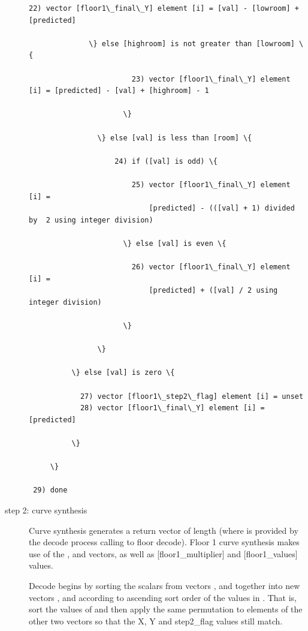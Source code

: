 \begin{description}
\begin{Verbatim}[commandchars=\\\{\}]
                        22) vector [floor1\_final\_Y] element [i] = [val] - [lowroom] + [predicted]

		      \} else [highroom] is not greater than [lowroom] \{

                        23) vector [floor1\_final\_Y] element [i] = [predicted] - [val] + [highroom] - 1

                      \}

                \} else [val] is less than [room] \{

                    24) if ([val] is odd) \{

                        25) vector [floor1\_final\_Y] element [i] =
                            [predicted] - (([val] + 1) divided by  2 using integer division)

                      \} else [val] is even \{

                        26) vector [floor1\_final\_Y] element [i] =
                            [predicted] + ([val] / 2 using integer division)

                      \}

                \}

          \} else [val] is zero \{

            27) vector [floor1\_step2\_flag] element [i] = unset
            28) vector [floor1\_final\_Y] element [i] = [predicted]

          \}

     \}

 29) done

\end{Verbatim}



\item[step 2: curve synthesis]

Curve synthesis generates a return vector \varname{[floor]} of length
\varname{[n]} (where \varname{[n]} is provided by the decode process
calling to floor decode).  Floor 1 curve synthesis makes use of the
,  and
 vectors, as well as [floor1\_multiplier]
and [floor1\_values] values.

Decode begins by sorting the scalars from vectors
,  and
 together into new vectors
,  and
 according to ascending sort order of the
values in .  That is, sort the values of
 and then apply the same permutation to
elements of the other two vectors so that the X, Y and step2\_flag
values still match.


\end{description}
